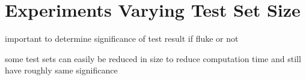 \section{Experiments Varying Test Set Size}


important to determine significance of test result 
	if fluke or not 
	
some test sets can easily be reduced in size
to reduce computation time and still have roughly same significance 

